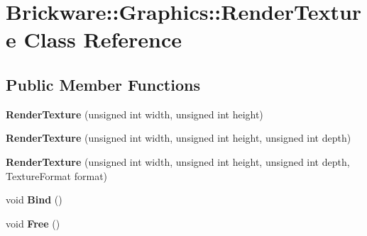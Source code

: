 \hypertarget{classBrickware_1_1Graphics_1_1RenderTexture}{}\section{Brickware\+:\+:Graphics\+:\+:Render\+Texture Class Reference}
\label{classBrickware_1_1Graphics_1_1RenderTexture}
\subsection*{Public Member Functions}
\begin{DoxyCompactItemize}
\item 
\hypertarget{classBrickware_1_1Graphics_1_1RenderTexture_aa445ae7150c27d95a45d00c0d47f8013}{}{\bfseries Render\+Texture} (unsigned int width, unsigned int height)\label{classBrickware_1_1Graphics_1_1RenderTexture_aa445ae7150c27d95a45d00c0d47f8013}

\item 
\hypertarget{classBrickware_1_1Graphics_1_1RenderTexture_a896ebb8267dd583a847919a34fcb2c12}{}{\bfseries Render\+Texture} (unsigned int width, unsigned int height, unsigned int depth)\label{classBrickware_1_1Graphics_1_1RenderTexture_a896ebb8267dd583a847919a34fcb2c12}

\item 
\hypertarget{classBrickware_1_1Graphics_1_1RenderTexture_a1f49c43e3786a6e9e1371220224f7e52}{}{\bfseries Render\+Texture} (unsigned int width, unsigned int height, unsigned int depth, Texture\+Format format)\label{classBrickware_1_1Graphics_1_1RenderTexture_a1f49c43e3786a6e9e1371220224f7e52}

\item 
\hypertarget{classBrickware_1_1Graphics_1_1RenderTexture_a45db8e605f0d5a086d1d077985ccd26e}{}void {\bfseries Bind} ()\label{classBrickware_1_1Graphics_1_1RenderTexture_a45db8e605f0d5a086d1d077985ccd26e}

\item 
\hypertarget{classBrickware_1_1Graphics_1_1RenderTexture_acdd750308acd34563ee7953343d03594}{}void {\bfseries Free} ()\label{classBrickware_1_1Graphics_1_1RenderTexture_acdd750308acd34563ee7953343d03594}

\end{DoxyCompactItemize}
